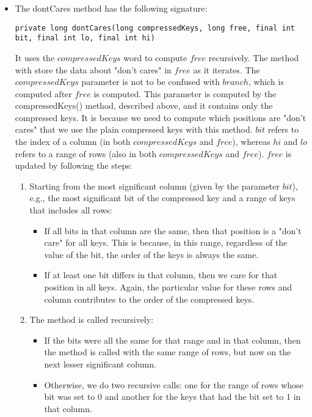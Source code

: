 \begin{itemize}
    \item
    The {\ttfamily dontCares} method has the following signature:
    \begin{lstlisting}
private long dontCares(long compressedKeys, long free, final int bit, final int lo, final int hi)
    \end{lstlisting}
    It uses the $compressedKeys$ word to compute $free$ recursively. The method with store the data about "don't cares" in $free$ as it iterates.
    The $compressedKeys$ parameter is not to be confused with $branch$, which is computed after $free$ is computed. This parameter is computed by the {\ttfamily compressedKeys()} method, described above, and it contains only the compressed keys. It is because we need to compute which positions are "don't cares" that we use the plain compressed keys with this method.
    $bit$ refers to the index of a column (in both $compressedKeys$ and $free$), whereas $hi$ and $lo$ refers to a range of rows (also in both $compressedKeys$ and $free$).
    $free$ is updated by following the steps:
    \begin{enumerate}
        \item
        Starting from the most significant column (given by the parameter $bit$), e.g., the most significant bit of the compressed key and a range of keys that includes all rows:
        \begin{itemize}
            \item
            If all bits in that column are the same, then that position is a "don't care" for all keys. This is because, in this range, regardless of the value of the bit, the order of the keys is always the same.
            
            \item
            If at least one bit differs in that column, then we care for that position in all keys. Again, the particular value for these rows and column contributes to the order of the compressed keys.
        \end{itemize}
        
        \item
        The method is called recursively:
        \begin{itemize}
            \item
            If the bits were all the same for that range and in that column, then the method is called with the same range of rows, but now on the next lesser significant column.
            
            \item
            Otherwise, we do two recursive calls: one for the range of rows whose bit was set to 0 and another for the keys that had the bit set to 1 in that column.
        \end{itemize}
        

\end{enumerate}
\end{itemize}
